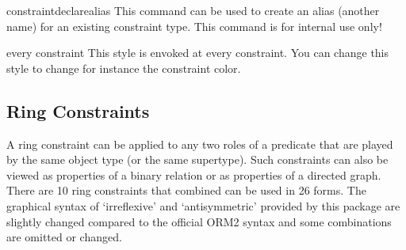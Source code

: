 \documentclass[a4paper,10pt]{article}
\begin{document}
\begin{command}{constraintdeclarealias}
  This command can be used to create an alias (another name) for an existing constraint type.
  This command is for internal use only!
\end{command}

\begin{stylekey}{every constraint}
  This style is envoked at every constraint. You can change this style to change for instance the constraint color.
\end{stylekey}


\subsection{Ring Constraints}
\label{sec:ringconstraints}

A ring constraint can be applied to any two roles of a predicate that are
played by the same object type (or the same supertype). Such constraints can
also be viewed as properties of a binary relation or as properties of a
directed graph. There are 10 ring constraints that combined can be used in 26
forms. The graphical syntax of `irreflexive' and `antisymmetric' provided by
this package are slightly changed compared to the official ORM2 syntax and
some combinations are omitted or changed.


\begin{codeexample}[]
\centering
{}
\end{codeexample}

\begin{codeexample}[width=2.5cm]
\end{codeexample}
\end{document}
